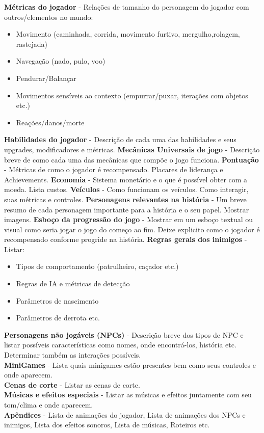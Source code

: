 \documentclass[12pt, 
openright, 
oneside, 
a4paper,    
brazil]{facom-ufu-abntex2}
\begin{document}
\textbf{Métricas do jogador} - Relações de tamanho do personagem do jogador com outros/elementos no mundo:
	\begin{itemize}
	\item Movimento (caminhada, corrida, movimento furtivo, mergulho,rolagem, rastejada)
	\item Navegação (nado, pulo, voo)
	\item Pendurar/Balançar
	\item Movimentos sensíveis ao contexto (empurrar/puxar, iterações com objetos etc.)
	\item Reações/danos/morte	
	\end{itemize}
\textbf{Habilidades do jogador} - Descrição de cada uma das habilidades e seus upgrades, modificadores e métricas.
\textbf{Mecânicas Universais de jogo} - Descrição breve de como cada uma das mecânicas que compõe o jogo funciona.
\textbf{Pontuação} - Métricas de como o jogador é recompensado. Placares de liderança e  Achievements.
\textbf{Economia} - Sistema monetário e o que é possível obter com a moeda. Lista custos.
\textbf{Veículos} - Como funcionam os veículos. Como interagir, suas métricas e controles.
\textbf{Personagens relevantes na história} - Um breve resumo de cada personagem importante para a história e o seu papel. Mostrar imagens.
\textbf{Esboço da progressão do jogo} - Mostrar em um esboço textual ou visual como seria jogar o jogo do começo ao fim. Deixe explicito como o jogador é recompensado conforme progride na história.   
\textbf{Regras gerais dos inimigos} - Listar:
	\begin{itemize}
	\item Tipos de comportamento (patrulheiro, caçador etc.)
	\item Regras de IA e métricas de detecção
	\item Parâmetros de nascimento
	\item Parâmetros de derrota etc.
	\end{itemize}
\textbf{Personagens não jogáveis (NPCs)} - Descrição breve dos tipos de NPC e listar possíveis características como nomes, onde encontrá-los, história etc. Determinar também as interações possíveis.\\
\textbf{MiniGames} - Lista quais minigames estão presentes bem como seus controles e onde aparecem.\\
\textbf{Cenas de corte} - Listar as cenas de corte.\\
\textbf{Músicas e efeitos especiais} - Listar as músicas e efeitos juntamente com seu tom/clima e onde aparecem.\\
\textbf{Apêndices} - Lista de animações do jogador, Lista de animações dos NPCs e inimigos, Lista dos efeitos sonoros, Lista de músicas, Roteiros etc.
\end{document}
